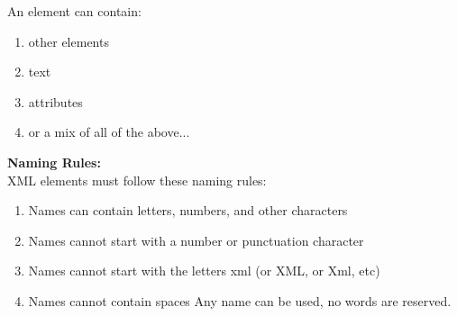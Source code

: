 \documentclass[a4paper,oneside]{book}
\begin{document}
An element can contain:
\begin{enumerate}
\item other elements
\item text
\item attributes
\item or a mix of all of the above...
\end{enumerate}
\textbf{Naming Rules:} \\
XML elements must follow these naming rules:
\begin{enumerate}
\item Names can contain letters, numbers, and other characters
\item Names cannot start with a number or punctuation character
\item Names cannot start with the letters xml (or XML, or Xml, etc)
\item Names cannot contain spaces
Any name can be used, no words are reserved.
\end{enumerate}
\end{document}
